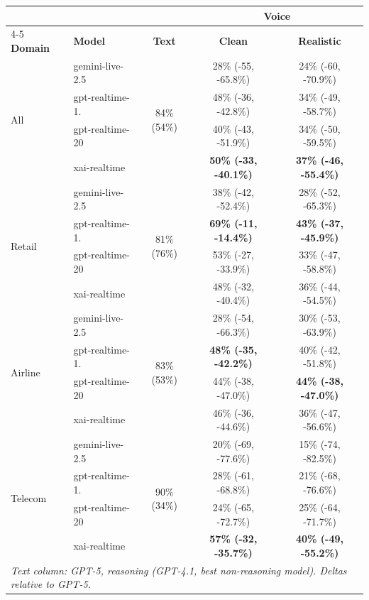 \begin{tabular}{@{}llccc@{}}
\toprule
 &  &  & \multicolumn{2}{c}{\textbf{Voice}} \\
\cmidrule(l){4-5}
\textbf{Domain} & \textbf{Model} & \textbf{Text} & \textbf{Clean} & \textbf{Realistic} \\
\midrule
\multirow{4}{*}{All} & gemini-live-2.5 & \multirow{4}{*}{84\% (54\%)} & 28\% (-55, -65.8\%) & 24\% (-60, -70.9\%) \\
 & gpt-realtime-1. &  & 48\% (-36, -42.8\%) & 34\% (-49, -58.7\%) \\
 & gpt-realtime-20 &  & 40\% (-43, -51.9\%) & 34\% (-50, -59.5\%) \\
 & xai-realtime &  & \textbf{50\% (-33, -40.1\%)} & \textbf{37\% (-46, -55.4\%)} \\
\midrule
\multirow{4}{*}{Retail} & gemini-live-2.5 & \multirow{4}{*}{81\% (76\%)} & 38\% (-42, -52.4\%) & 28\% (-52, -65.3\%) \\
 & gpt-realtime-1. &  & \textbf{69\% (-11, -14.4\%)} & \textbf{43\% (-37, -45.9\%)} \\
 & gpt-realtime-20 &  & 53\% (-27, -33.9\%) & 33\% (-47, -58.8\%) \\
 & xai-realtime &  & 48\% (-32, -40.4\%) & 36\% (-44, -54.5\%) \\
\midrule
\multirow{4}{*}{Airline} & gemini-live-2.5 & \multirow{4}{*}{83\% (53\%)} & 28\% (-54, -66.3\%) & 30\% (-53, -63.9\%) \\
 & gpt-realtime-1. &  & \textbf{48\% (-35, -42.2\%)} & 40\% (-42, -51.8\%) \\
 & gpt-realtime-20 &  & 44\% (-38, -47.0\%) & \textbf{44\% (-38, -47.0\%)} \\
 & xai-realtime &  & 46\% (-36, -44.6\%) & 36\% (-47, -56.6\%) \\
\midrule
\multirow{4}{*}{Telecom} & gemini-live-2.5 & \multirow{4}{*}{90\% (34\%)} & 20\% (-69, -77.6\%) & 15\% (-74, -82.5\%) \\
 & gpt-realtime-1. &  & 28\% (-61, -68.8\%) & 21\% (-68, -76.6\%) \\
 & gpt-realtime-20 &  & 24\% (-65, -72.7\%) & 25\% (-64, -71.7\%) \\
 & xai-realtime &  & \textbf{57\% (-32, -35.7\%)} & \textbf{40\% (-49, -55.2\%)} \\
\bottomrule
\multicolumn{5}{l}{\footnotesize \textit{Text column: GPT-5, reasoning (GPT-4.1, best non-reasoning model). Deltas relative to GPT-5.}} \\
\end{tabular}
